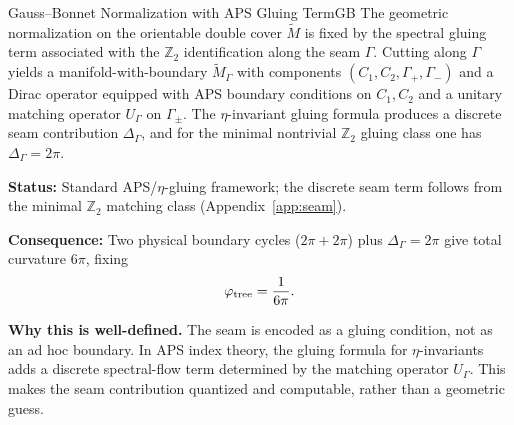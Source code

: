 \begin{axiom}{Gauss--Bonnet Normalization with APS Gluing Term}{GB}
The geometric normalization on the orientable double cover $\widetilde{M}$ is fixed by the
spectral gluing term associated with the $\mathbb{Z}_2$ identification along the seam $\Gamma$.
Cutting along $\Gamma$ yields a manifold-with-boundary $\widetilde{M}_\Gamma$ with components
$(C_1,C_2,\Gamma_+,\Gamma_-)$ and a Dirac operator equipped with APS boundary conditions on
$C_1,C_2$ and a unitary matching operator $U_\Gamma$ on $\Gamma_\pm$. The $\eta$-invariant gluing
formula produces a discrete seam contribution $\Delta_\Gamma$, and for the minimal nontrivial
$\mathbb{Z}_2$ gluing class one has $\Delta_\Gamma = 2\pi$.

\tcblower
\textbf{Status:} Standard APS/$\eta$-gluing framework; the discrete seam term follows from the
minimal $\mathbb{Z}_2$ matching class (Appendix~\ref{app:seam}).

\textbf{Consequence:} Two physical boundary cycles ($2\pi+2\pi$) plus $\Delta_\Gamma=2\pi$ give
total curvature $6\pi$, fixing
\begin{equation}
    \varphi_{\mathrm{tree}} = \frac{1}{6\pi}.
\end{equation}
\end{axiom}

\noindent\textbf{Why this is well-defined.} The seam is encoded as a gluing condition, not as an
ad hoc boundary. In APS index theory, the gluing formula for $\eta$-invariants adds a discrete
spectral-flow term determined by the matching operator $U_\Gamma$. This makes the seam
contribution quantized and computable, rather than a geometric guess.

